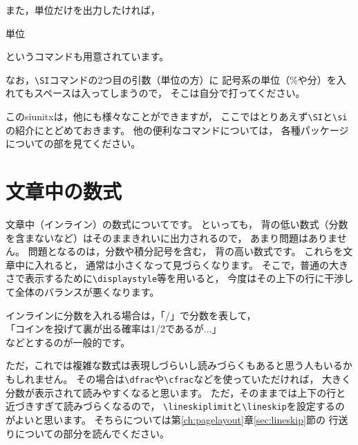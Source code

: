 また，単位だけを出力したければ，
\begin{ITeX}
\si{単位}
\end{ITeX}
というコマンドも用意されています。

なお，\verb|\SI|コマンドの2つ目の引数（単位の方）に
記号系の単位（{\%}や分）を入れてもスペースは入ってしまうので，
そこは自分で打ってください。

このsiunitxは，他にも様々なことができますが，
ここではとりあえず\verb|\SI|と\verb|\si|の紹介にとどめておきます。
他の便利なコマンドについては，
各種パッケージについての部を見てください。



\section{文章中の数式}
文章中（インライン）の数式についてです。
といっても，
背の低い数式（分数を含まないなど）はそのままきれいに出力されるので，
あまり問題はありません。
問題となるのは，分数や積分記号を含む，
背の高い数式です。
これらを文章中に入れると，
通常は小さくなって見づらくなります。
そこで，普通の大きさで表示するために\verb|\displaystyle|等を用いると，
今度はその上下の行に干渉して全体のバランスが悪くなります。

インラインに分数を入れる場合は，「/」で分数を表して，\\
\hspace{5zw} 「コインを投げて裏が出る確率は1/2であるが...」 \\
などとするのが一般的です。

ただ，これでは複雑な数式は表現しづらいし読みづらくもあると思う人もいるかもしれません。
その場合は\verb|\dfrac|や\verb|\cfrac|などを使っていただければ，
大きく分数が表示されて読みやすくなると思います。
ただ，そのままでは上下の行と近づきすぎて読みづらくなるので，
\verb|\lineskiplimit|と\verb|\lineskip|を設定するのがよいと思います。
そちらについては第\ref{ch:pagelayout}章\ref{sec:lineskip}節の
行送りについての部分を読んでください。

